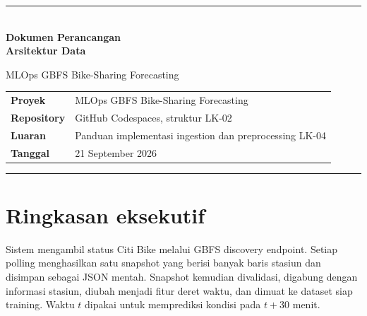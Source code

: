 \documentclass[10pt,a4paper]{article}
\begin{document}
\begin{titlepage}
\thispagestyle{empty}
\vspace*{1.2cm}
{\color{navy}\rule{\textwidth}{3pt}}\\[1.2cm]
{\color{navy}\Huge\bfseries Dokumen Perancangan\\[0.15cm]
Arsitektur Data}\par
\vspace{0.45cm}
{\color{blue}\Large MLOps GBFS Bike-Sharing Forecasting}\par
\vspace{1.4cm}
\vfill
\begin{tabular}{@{}ll@{}}
\textbf{Proyek} & MLOps GBFS Bike-Sharing Forecasting\\
\textbf{Repository} & GitHub Codespaces, struktur LK-02\\
\textbf{Luaran} & Panduan implementasi ingestion dan preprocessing LK-04\\
\textbf{Tanggal} & 21 September 2026
\end{tabular}
\vspace{0.7cm}
\par{\color{navy}\rule{\textwidth}{1.5pt}}
\end{titlepage}

\section*{Ringkasan eksekutif}
Sistem mengambil status Citi Bike melalui GBFS discovery endpoint. Setiap
polling menghasilkan satu snapshot yang berisi banyak baris stasiun dan
disimpan sebagai JSON mentah. Snapshot kemudian divalidasi, digabung dengan
informasi stasiun, diubah menjadi fitur deret waktu, dan dimuat ke dataset
siap training. Waktu $t$ dipakai untuk memprediksi kondisi pada $t+30$ menit.
\end{document}
